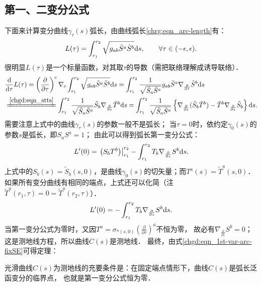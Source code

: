 \subsection{第一、二变分公式}
下面来计算变分曲线$\gamma_\tau(s)$弧长，由曲线弧长\eqref{chrg:eqn_arc-length}有：
\begin{equation}
    L(\tau)=\int_{r_1}^{r_2} \sqrt{g_{ab} \tilde{S}^a \tilde{S}^b} {\rm d}s,
     \qquad \forall \tau \in (-\epsilon,\epsilon) .
\end{equation}
很明显$L(\tau)$是一个标量函数，对其取$\tau$的导数（需把联络理解成诱导联络）．
\begin{align}
    &\frac{{\rm d}}{{\rm d} \tau }L(\tau)= \left(\frac{\partial}{\partial \tau}\right)^c \nabla_c
    \int_{r_1}^{r_2} \sqrt{ g_{ab} \tilde{S}^a \tilde{S}^b } {\rm d}s
    =  \int_{r_1}^{r_2} \frac{1}{\sqrt{ \tilde{S}_a \tilde{S}^a } } g_{ab} \tilde{S}^a
     \nabla_{\frac{\partial}{\partial \tau}} \tilde{S}^b {\rm d}s        \label{chgd:eqn_1st-tmp02} \\
    &\xlongequal{\ref{chgd:eqn_stts}} 
      \int_{r_1}^{r_2} \frac{1}{\sqrt{ \tilde{S}_a \tilde{S}^a } }
      \tilde{S}_b \nabla_{\frac{\partial}{\partial s}} \tilde{T}^b {\rm d}s
    =\int_{r_1}^{r_2}\frac{1}{\sqrt{ \tilde{S}_a \tilde{S}^a } }
    \left\{ \nabla_{\frac{\partial}{\partial s}} (\tilde{S}_b  \tilde{T}^b)
     -  \tilde{T}^b \nabla_{\frac{\partial}{\partial s}} \tilde{S}_b \right\} {\rm d}s . \notag
\end{align}  %
需要注意上式中的曲线$\gamma_\tau(s)$的参数一般不是弧长；
当$\tau=0$时，依约定$\gamma_0(s)$的参数$s$是弧长，即${S}_a {S}^a=1$；
由此可以得到{\heiti 弧长第一变分公式}：  
\begin{equation}\label{chgd:eqn_1st-var-arc}
    L'(0)= \left.\left({S}_b  {T}^b\right)\right|_{r_1}^{r_2} - \int_{r_1}^{r_2}
    {T}_b \nabla_{\frac{\partial}{\partial s}} {S}^b {\rm d}s .
\end{equation}
上式中的$S_b(s)=\tilde{S}_b(s,0)$，是曲线$\gamma_0(s)$的切矢量；而$T^a(s)= \tilde{T}^a(s,0)$．
如果所有变分曲线有相同的端点，上式还可以化简（注$\tilde{T}^a(r_1,\tau)=0=\tilde{T}^a(r_2,\tau)$）．
\begin{equation}\label{chgd:eqn_1st-var-arc-fixSE}
    L'(0)= -\int_{r_1}^{r_2} {T}_b  \nabla_{\frac{\partial}{\partial s}} {S}^b {\rm d}s .
\end{equation}
当第一变分公式为零时，又因${T}^a=\sigma_{*(s,0)}\left(\frac{\partial}{\partial \tau}\right)^a$不恒为零，
故必有$\nabla_{\frac{\partial}{\partial s}} {S}^b=0$；这是测地线方程，所以曲线$C(s)$是测地线．
最终，由式\eqref{chgd:eqn_1st-var-arc-fixSE}可得定理：
\begin{theorem}\label{chgd:thm_geo-1st-var}
    光滑曲线$C(s)$为测地线的充要条件是：在固定端点情形下，曲线$C(s)$是弧长泛函变分的临界点，
    也就是第一变分公式恒为零．
\end{theorem}


